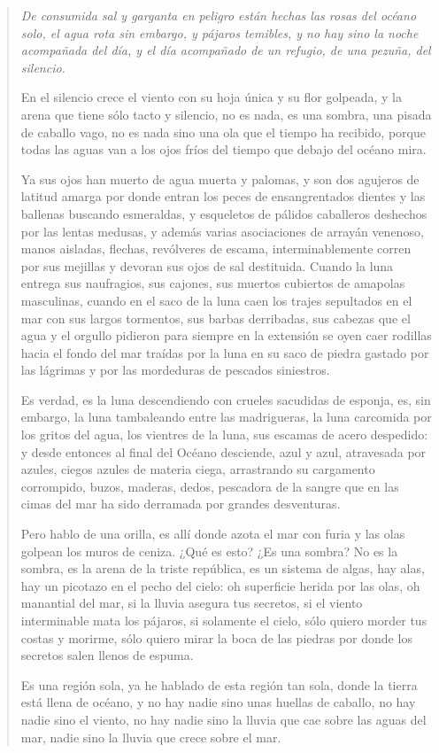 \documentclass[12pt]{article}
\begin{document}
\clearpage
{}
\begin{verse}
\itshape
De consumida sal y garganta en peligro  
están hechas las rosas del océano solo,  
el agua rota sin embargo,  
y pájaros temibles,  
y no hay sino la noche acompañada  
del día, y el día acompañado  
de un refugio, de una  
pezuña, del silencio.  
	
En el silencio crece el viento  
con su hoja única y su flor golpeada,  
y la arena que tiene sólo tacto y silencio,  
no es nada, es una sombra,  
una pisada de caballo vago,  
no es nada sino una ola que el tiempo ha recibido,  
porque todas las aguas van a los ojos fríos  
del tiempo que debajo del océano mira.  
	
Ya sus ojos han muerto de agua muerta y palomas,  
y son dos agujeros de latitud amarga  
por donde entran los peces de ensangrentados dientes  
y las ballenas buscando esmeraldas,  
y esqueletos de pálidos caballeros deshechos  
por las lentas medusas, y además  
varias asociaciones de arrayán venenoso,  
manos aisladas, flechas,  
revólveres de escama,  
interminablemente corren por sus mejillas  
y devoran sus ojos de sal destituida.  
Cuando la luna entrega sus naufragios,  
sus cajones, sus muertos  
cubiertos de amapolas masculinas,  
cuando en el saco de la luna caen  
los trajes sepultados en el mar  
con sus largos tormentos, sus barbas derribadas,  
sus cabezas que el agua y el orgullo pidieron para siempre  
en la extensión se oyen caer rodillas  
hacia el fondo del mar traídas por la luna  
en su saco de piedra gastado por las lágrimas  
y por las mordeduras de pescados siniestros.  
	
Es verdad, es la luna descendiendo  
con crueles sacudidas de esponja, es, sin embargo,  
la luna tambaleando entre las madrigueras,  
la luna carcomida por los gritos del agua,  
los vientres de la luna, sus escamas  
de acero despedido: y desde entonces  
al final del Océano desciende,  
azul y azul, atravesada por azules,  
ciegos azules de materia ciega,  
arrastrando su cargamento corrompido,  
buzos, maderas, dedos,  
pescadora de la sangre que en las cimas del mar  
ha sido derramada por grandes desventuras.  
	
Pero hablo de una orilla, es allí donde azota  
el mar con furia y las olas golpean  
los muros de ceniza. ¿Qué es esto? ¿Es una sombra?  
No es la sombra, es la arena de la triste república,  
es un sistema de algas, hay alas, hay  
un picotazo en el pecho del cielo:  
oh superficie herida por las olas,  
oh manantial del mar,  
si la lluvia asegura tus secretos, si el viento interminable  
mata los pájaros, si solamente el cielo,  
sólo quiero morder tus costas y morirme,  
sólo quiero mirar la boca de las piedras  
por donde los secretos salen llenos de espuma.  
	
Es una región sola, ya he hablado  
de esta región tan sola,  
donde la tierra está llena de océano,  
y no hay nadie sino unas huellas de caballo,  
no hay nadie sino el viento, no hay nadie  
sino la lluvia que cae sobre las aguas del mar,  
nadie sino la lluvia que crece sobre el mar.  

\end{verse}
\end{document}
